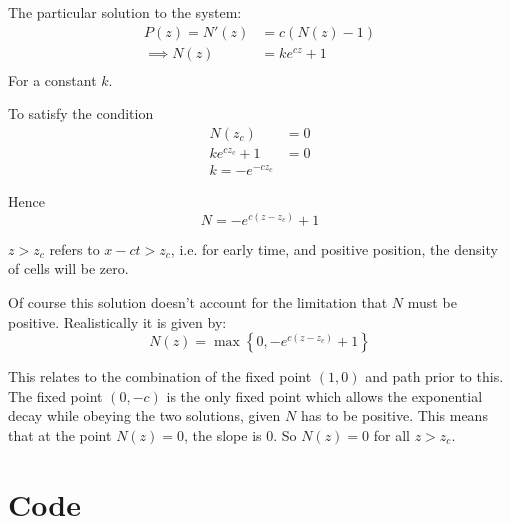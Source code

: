 \documentclass{X:/Documents/Coding/Latex/myassignment}
\begin{document}
\begin{enumerate}
\begin{enumerate}
		The particular solution to the system:
		\begin{align*}
			P(z) =N'(z) &= c(N(z) - 1)\\
			\implies N(z) &= k e^{cz} + 1\\
		\end{align*}
		For a constant $k$.

		To satisfy the condition
		\begin{align*}
			N(z_c) &= 0 \\
			k e^{cz_c} + 1 &=0\\
			k = -e^{-cz_c}
		\end{align*}

		Hence
		\[N = -e^{c(z-z_c)} + 1\]

		$z > z_c$ refers to $x - ct > z_c$, i.e. for early time, and positive position, the density of cells will be zero.

		Of course this solution doesn't account for the limitation that $N$ must be positive. Realistically it is given by:
		\[N(z) = \max\left\{0,-e^{c(z-z_c)} + 1\right\}\]

		This relates to the combination of the fixed point $(1,0)$ and path prior to this. The fixed point $(0,-c)$ is the only fixed point which allows the exponential decay while obeying the two solutions, given $N$ has to be positive. This means that at the point $N(z) = 0$, the slope is $0$. So $N(z)=0$ for all $z > z_c$. 
	\end{enumerate}
\end{enumerate}

\section*{Code}




\end{document}

